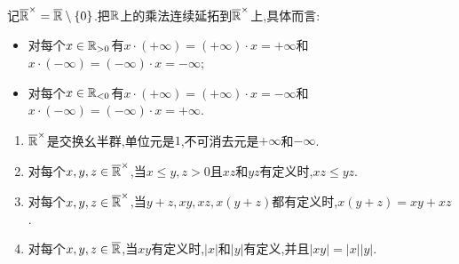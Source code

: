 \begin{proposition}{}{}
	记$\overline{\mathbb{R}}^{\times}=\overline{\mathbb{R}}\setminus\left\{0\right\}$.把$\mathbb{R}$上的乘法连续延拓到$\overline{\mathbb{R}}^{\times}$上,具体而言:
	\begin{itemize}
		\item 对每个$x\in\mathbb{R}_{>0}$有$x\cdot\left(+\infty\right)=\left(+\infty\right)\cdot x=+\infty$和$x\cdot\left(-\infty\right)=\left(-\infty\right)\cdot x=-\infty$;
		\item 对每个$x\in\mathbb{R}_{<0}$有$x\cdot\left(+\infty\right)=\left(+\infty\right)\cdot x=-\infty$和$x\cdot\left(-\infty\right)=\left(-\infty\right)\cdot x=+\infty$.
	\end{itemize}
	\begin{enumerate}
		\item $\overline{\mathbb{R}}^{\times}$是交换幺半群,单位元是$1$,不可消去元是$+\infty$和$-\infty$.
		\item 对每个$x,y,z\in\overline{\mathbb{R}}^{\times}$,当$x\leq y,z>0$且$xz$和$yz$有定义时,$xz\leq yz$.
		\item 对每个$x,y,z\in\overline{\mathbb{R}}^{\times}$,当$y+z,xy,xz,x\left(y+z\right)$都有定义时,$x\left(y+z\right)=xy+xz$.
		\item 对每个$x,y,z\in\overline{\mathbb{R}}$,当$xy$有定义时,$\left|x\right|$和$\left|y\right|$有定义,并且$\left|xy\right|=\left|x\right|\left|y\right|$.
	\end{enumerate}
\end{proposition}

